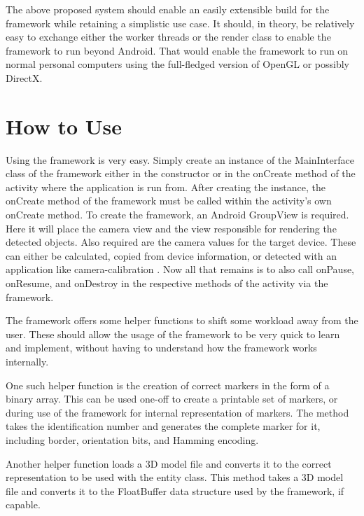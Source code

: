 The above proposed system should enable an easily extensible build for the framework while retaining a simplistic use case.
It should, in theory, be relatively easy to exchange either the worker threads or the render class to enable the framework to run beyond Android.
That would enable the framework to run on normal personal computers using the full-fledged version of OpenGL or possibly DirectX.

\section{How to Use}

Using the framework is very easy.
Simply create an instance of the MainInterface class of the framework either in the constructor or in the onCreate method of the activity where the application is run from.
After creating the instance, the onCreate method of the framework must be called within the activity's own onCreate method.
To create the framework, an Android GroupView is required.
Here it will place the camera view and the view responsible for rendering the detected objects. Also required are the camera values for the target device.
These can either be calculated, copied from device information, or detected with an application like camera-calibration \cite{calib}.
Now all that remains is to also call onPause, onResume, and onDestroy in the respective methods of the activity via the framework.

The framework offers some helper functions to shift some workload away from the user.
These should allow the usage of the framework to be very quick to learn and implement, without having to understand how the framework works internally.

One such helper function is the creation of correct markers in the form of a binary array.
This can be used one-off to create a printable set of markers, or during use of the framework for internal representation of markers.
The method takes the identification number and generates the complete marker for it, including border, orientation bits, and Hamming encoding.

Another helper function loads a 3D model file and converts it to the correct representation to be used with the entity class.
This method takes a 3D model file and converts it to the FloatBuffer data structure used by the framework, if capable.
